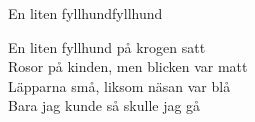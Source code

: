 \begin{song}{En liten fyllhund}{fyllhund}
\begin{vers}
En liten fyllhund på krogen satt\\
Rosor på kinden, men blicken var matt\\
Läpparna små, liksom näsan var blå\\
Bara jag kunde så skulle jag gå\\
\end{vers}
\end{song}
